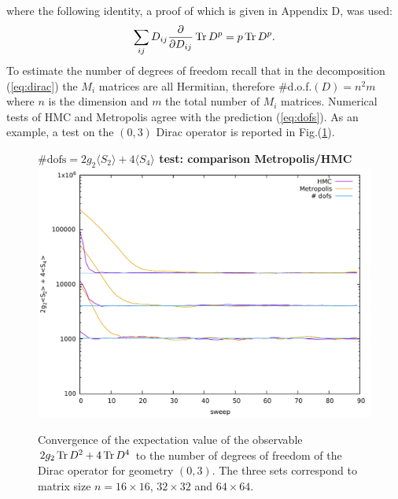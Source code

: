 where the following identity, a proof of which is given in Appendix D, was used:
\begin{equation}
\sum_{ij} D_{ij} \frac{\partial}{\partial D_{ij}} \operatorname{Tr} D^p = p \operatorname{Tr} D^p.
\end{equation}
To estimate the number of degrees of freedom recall that in the decomposition (\ref{eq:dirac}) the $M_i$ matrices are all Hermitian, therefore {\#}d.o.f.$(D) = n^2m$ where $n$ is the dimension and $m$ the total number of $M_i$ matrices.\newline
Numerical tests of HMC and Metropolis agree with the prediction (\ref{eq:dofs}). As an example, a test on the $(0,3)$ Dirac operator is reported in Fig.(\ref{fig:dofs}).
\begin{figure}[hp]
\centering
\textbf{$\text{\# dofs} = 2 g_2 \langle S_2 \rangle + 4\langle S_4 \rangle$ test: comparison Metropolis/HMC}
\includegraphics[width=1\linewidth]{fig/dofsp0q3.pdf}
\caption{Convergence of the expectation value of the observable $2 g_2 \operatorname{Tr} D^2 + 4 \operatorname{Tr} D^4 $ to the number of degrees of freedom of the Dirac operator for geometry $(0,3)$. The three sets correspond to matrix size $n = 16 \times 16$, $32 \times 32$ and $64 \times 64$. }
\label{fig:dofs}
\end{figure}

